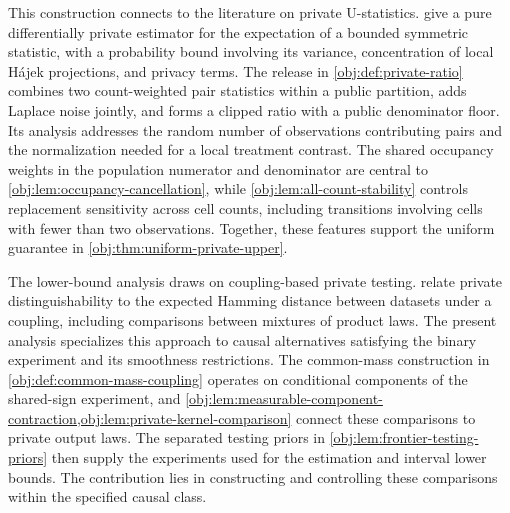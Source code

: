\documentclass[11pt]{article}
\begin{document}
This construction connects to the literature on private U-statistics. \citet[][Theorem 2]{ChaudhuriLohPandeySarkar2024} give a pure differentially private estimator for the expectation of a bounded symmetric statistic, with a probability bound involving its variance, concentration of local H\'ajek projections, and privacy terms. The release in \cref{obj:def:private-ratio} combines two count-weighted pair statistics within a public partition, adds Laplace noise jointly, and forms a clipped ratio with a public denominator floor. Its analysis addresses the random number of observations contributing pairs and the normalization needed for a local treatment contrast. The shared occupancy weights in the population numerator and denominator are central to \cref{obj:lem:occupancy-cancellation}, while \cref{obj:lem:all-count-stability} controls replacement sensitivity across cell counts, including transitions involving cells with fewer than two observations. Together, these features support the uniform guarantee in \cref{obj:thm:uniform-private-upper}.

The lower-bound analysis draws on coupling-based private testing. \citet[][Section 2]{AcharyaSunZhang2021} relate private distinguishability to the expected Hamming distance between datasets under a coupling, including comparisons between mixtures of product laws. The present analysis specializes this approach to causal alternatives satisfying the binary experiment and its smoothness restrictions. The common-mass construction in \cref{obj:def:common-mass-coupling} operates on conditional components of the shared-sign experiment, and \cref{obj:lem:measurable-component-contraction,obj:lem:private-kernel-comparison} connect these comparisons to private output laws. The separated testing priors in \cref{obj:lem:frontier-testing-priors} then supply the experiments used for the estimation and interval lower bounds. The contribution lies in constructing and controlling these comparisons within the specified causal class.
\end{document}
